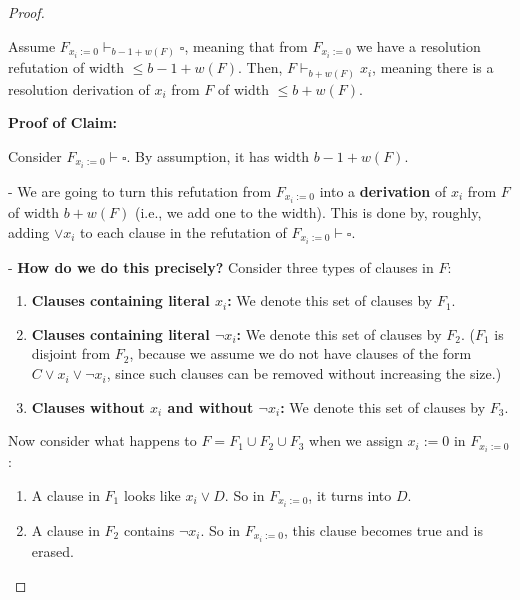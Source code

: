 \begin{proof}

\begin{claim}
Assume $F_{x_i := 0} \vdash_{b - 1 + w(F)} \square$, meaning that from $F_{x_i := 0}$ we have a resolution refutation of width $\leq b - 1 + w(F)$. Then, $F \vdash_{b + w(F)} x_i$, meaning there is a resolution derivation of $x_i$ from $F$ of width $\leq b + w(F)$.
\end{claim}

\textbf{Proof of Claim:} 

Consider $F_{x_i := 0} \vdash \square$. By assumption, it has width $b - 1 + w(F)$.

- We are going to turn this refutation from $F_{x_i := 0}$ into a \textbf{derivation} of $x_i$ from $F$ of width $b + w(F)$ (i.e., we add one to the width).  
  This is done by, roughly, adding $\lor x_i$ to each clause in the refutation of $F_{x_i := 0} \vdash \square$.

- \textbf{How do we do this precisely?}  
  Consider three types of clauses in $F$:

  \begin{enumerate}
      \item \textbf{Clauses containing literal $x_i$:}  
      We denote this set of clauses by $F_1$.
      
      \item \textbf{Clauses containing literal $\neg x_i$:}  
      We denote this set of clauses by $F_2$.  
      ($F_1$ is disjoint from $F_2$, because we assume we do not have clauses of the form $C \lor x_i \lor \neg x_i$, since such clauses can be removed without increasing the size.)

      \item \textbf{Clauses without $x_i$ and without $\neg x_i$:}  
      We denote this set of clauses by $F_3$.
  \end{enumerate}
 

Now consider what happens to $F = F_1 \cup F_2 \cup F_3$  
when we assign $x_i := 0$ in $F_{x_i := 0}$:

\begin{enumerate}
    \item A clause in $F_1$ looks like $x_i \lor D$.  
    So in $F_{x_i := 0}$, it turns into $D$.
    
    \item A clause in $F_2$ contains $\neg x_i$.  
    So in $F_{x_i := 0}$, this clause becomes true and is erased.
    

\end{enumerate}
\end{proof}
